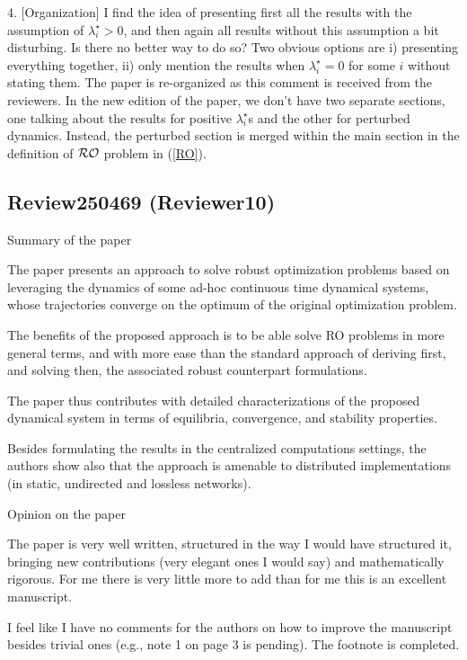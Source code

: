 \documentclass[journal,twoside,web]{ieeecolor}
\begin{document}
4. [Organization]
{\color{red}I find the idea of presenting first all the results with the assumption of $\lambda^\star_i>0$, and then again all results without this assumption a bit disturbing. Is there no better way to do so? Two obvious options are i) presenting everything together, ii) only mention the results when $\lambda^\star_i=0$ for some $i$ without stating them.} {\color{blue} The paper is re-organized as this comment is received from the reviewers. In the new edition of the paper, we don't have two separate sections, one talking about the results for positive $\lambda^\star_i$s and the other for perturbed dynamics. Instead, the perturbed section is merged within the main section in the definition of ${\cal RO}$ problem in (\ref{RO}).}

\subsection{Review250469 (Reviewer10)}

Summary of the paper

The paper presents an approach to solve robust optimization problems based on leveraging the dynamics of some ad-hoc continuous time dynamical systems, whose trajectories converge on the optimum of the original optimization problem.

The benefits of the proposed approach is to be able solve RO problems in more general terms, and with more ease than the standard approach of deriving first, and solving then, the associated robust counterpart formulations.

The paper thus contributes with detailed characterizations of the proposed dynamical system in terms of equilibria, convergence, and stability properties.

Besides formulating the results in the centralized computations settings, the authors show also that the approach is amenable to distributed implementations (in static, undirected and lossless networks).

Opinion on the paper

The paper is very well written, structured in the way I would have structured it, bringing new contributions (very elegant ones I would say) and mathematically rigorous. For me there is very little more to add than for me this is an excellent manuscript.

{\color{red}I feel like I have no comments for the authors on how to improve the manuscript besides trivial ones (e.g., note 1 on page 3 is pending).} {\color{blue} The footnote is completed.}
\end{document}
